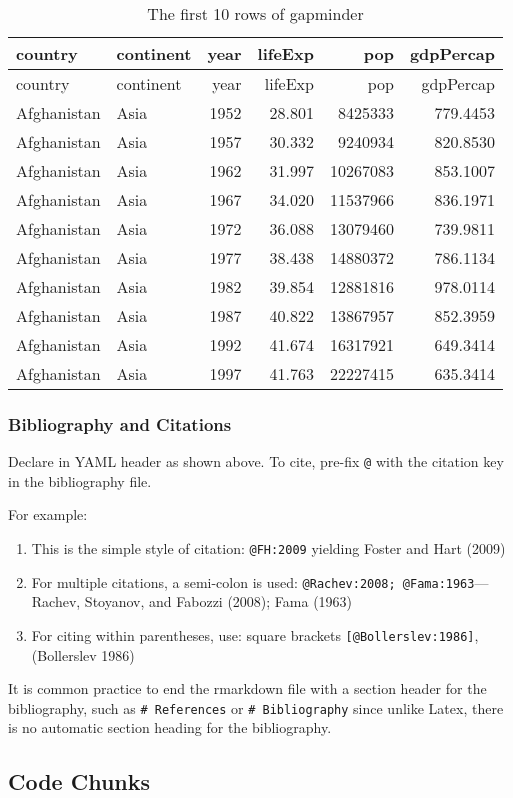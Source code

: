 \documentclass[11pt,]{article}
\providecommand{\tightlist}{%
  \setlength{\itemsep}{0pt}\setlength{\parskip}{0pt}}
\begin{document}
\begin{longtable}[]{@{}llrrrr@{}}
\caption{The first 10 rows of gapminder}\tabularnewline
\toprule
country & continent & year & lifeExp & pop & gdpPercap\tabularnewline
\midrule
\endfirsthead
\toprule
country & continent & year & lifeExp & pop & gdpPercap\tabularnewline
\midrule
\endhead
Afghanistan & Asia & 1952 & 28.801 & 8425333 & 779.4453\tabularnewline
Afghanistan & Asia & 1957 & 30.332 & 9240934 & 820.8530\tabularnewline
Afghanistan & Asia & 1962 & 31.997 & 10267083 & 853.1007\tabularnewline
Afghanistan & Asia & 1967 & 34.020 & 11537966 & 836.1971\tabularnewline
Afghanistan & Asia & 1972 & 36.088 & 13079460 & 739.9811\tabularnewline
Afghanistan & Asia & 1977 & 38.438 & 14880372 & 786.1134\tabularnewline
Afghanistan & Asia & 1982 & 39.854 & 12881816 & 978.0114\tabularnewline
Afghanistan & Asia & 1987 & 40.822 & 13867957 & 852.3959\tabularnewline
Afghanistan & Asia & 1992 & 41.674 & 16317921 & 649.3414\tabularnewline
Afghanistan & Asia & 1997 & 41.763 & 22227415 & 635.3414\tabularnewline
\bottomrule
\end{longtable}

\subsubsection{Bibliography and
Citations}\label{bibliography-and-citations}

Declare in YAML header as shown above. To cite, pre-fix \texttt{@} with
the citation key in the bibliography file.

For example:

\begin{enumerate}
\def\labelenumi{\arabic{enumi}.}
\tightlist
\item
  This is the simple style of citation: \texttt{@FH:2009} yielding
  Foster and Hart (2009)
\item
  For multiple citations, a semi-colon is used:
  \texttt{@Rachev:2008;\ @Fama:1963}---Rachev, Stoyanov, and Fabozzi
  (2008); Fama (1963)
\item
  For citing within parentheses, use: square brackets
  \texttt{{[}@Bollerslev:1986{]}}, (Bollerslev 1986)
\end{enumerate}

It is common practice to end the rmarkdown file with a section header
for the bibliography, such as \texttt{\#\ References} or
\texttt{\#\ Bibliography} since unlike Latex, there is no automatic
section heading for the bibliography.

\subsection{Code Chunks}\label{code-chunks}
\end{document}
